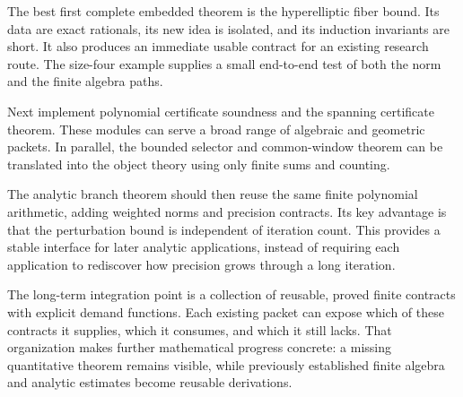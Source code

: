 The best first complete embedded theorem is the hyperelliptic fiber
bound. Its data are exact rationals, its new idea is isolated, and its
induction invariants are short. It also produces an immediate usable
contract for an existing research route. The size-four example supplies
a small end-to-end test of both the norm and the finite algebra paths.

Next implement polynomial certificate soundness and the spanning
certificate theorem. These modules can serve a broad range of algebraic
and geometric packets. In parallel, the bounded selector and
common-window theorem can be translated into the object theory using
only finite sums and counting.

The analytic branch theorem should then reuse the same finite polynomial
arithmetic, adding weighted norms and precision contracts. Its key
advantage is that the perturbation bound is independent of iteration
count. This provides a stable interface for later analytic applications,
instead of requiring each application to rediscover how precision grows
through a long iteration.

The long-term integration point is a collection of reusable, proved
finite contracts with explicit demand functions. Each existing packet
can expose which of these contracts it supplies, which it consumes,
and which it still lacks. That organization makes further mathematical
progress concrete: a missing quantitative theorem remains visible,
while previously established finite algebra and analytic estimates
become reusable derivations.
